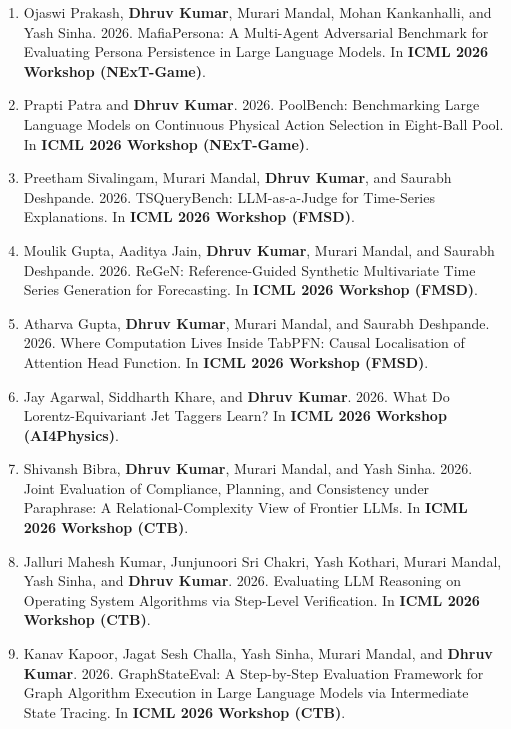 \documentclass[10pt, a4paper]{article}
\begin{document}
\begin{enumerate}[label=\textbf{W\arabic*.}, leftmargin=2.8em, itemsep=0.3em]
\item Ojaswi Prakash, \textbf{Dhruv Kumar}, Murari Mandal, Mohan Kankanhalli, and Yash Sinha. 2026. MafiaPersona: A Multi-Agent Adversarial Benchmark for Evaluating Persona Persistence in Large Language Models. In \textbf{ICML 2026 Workshop (NExT-Game)}.

\item Prapti Patra and \textbf{Dhruv Kumar}. 2026. PoolBench: Benchmarking Large Language Models on Continuous Physical Action Selection in Eight-Ball Pool. In \textbf{ICML 2026 Workshop (NExT-Game)}.

\item Preetham Sivalingam, Murari Mandal, \textbf{Dhruv Kumar}, and Saurabh Deshpande. 2026. TSQueryBench: LLM-as-a-Judge for Time-Series Explanations. In \textbf{ICML 2026 Workshop (FMSD)}.

\item Moulik Gupta, Aaditya Jain, \textbf{Dhruv Kumar}, Murari Mandal, and Saurabh Deshpande. 2026. ReGeN: Reference-Guided Synthetic Multivariate Time Series Generation for Forecasting. In \textbf{ICML 2026 Workshop (FMSD)}.

\item Atharva Gupta, \textbf{Dhruv Kumar}, Murari Mandal, and Saurabh Deshpande. 2026. Where Computation Lives Inside TabPFN: Causal Localisation of Attention Head Function. In \textbf{ICML 2026 Workshop (FMSD)}.

\item Jay Agarwal, Siddharth Khare, and \textbf{Dhruv Kumar}. 2026. What Do Lorentz-Equivariant Jet Taggers Learn? In \textbf{ICML 2026 Workshop (AI4Physics)}.

\item Shivansh Bibra, \textbf{Dhruv Kumar}, Murari Mandal, and Yash Sinha. 2026. Joint Evaluation of Compliance, Planning, and Consistency under Paraphrase: A Relational-Complexity View of Frontier LLMs. In \textbf{ICML 2026 Workshop (CTB)}.

\item Jalluri Mahesh Kumar, Junjunoori Sri Chakri, Yash Kothari, Murari Mandal, Yash Sinha, and \textbf{Dhruv Kumar}. 2026. Evaluating LLM Reasoning on Operating System Algorithms via Step-Level Verification. In \textbf{ICML 2026 Workshop (CTB)}.

\item Kanav Kapoor, Jagat Sesh Challa, Yash Sinha, Murari Mandal, and \textbf{Dhruv Kumar}. 2026. GraphStateEval: A Step-by-Step Evaluation Framework for Graph Algorithm Execution in Large Language Models via Intermediate State Tracing. In \textbf{ICML 2026 Workshop (CTB)}.


\end{enumerate}
\end{document}
